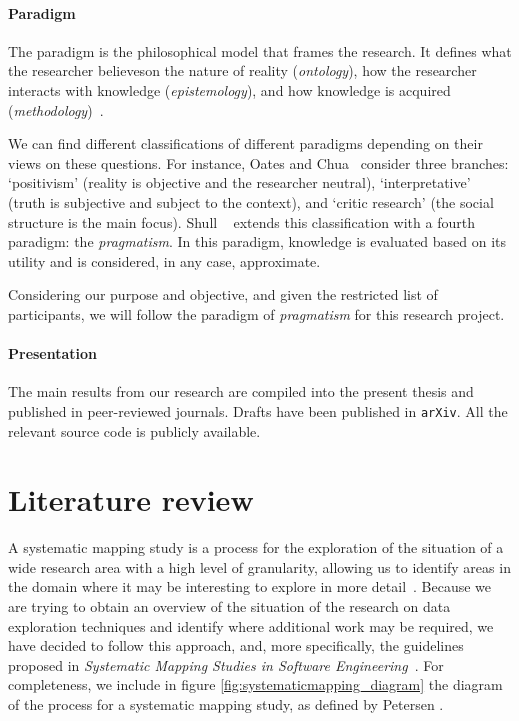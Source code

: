 \paragraph{Paradigm}
\label{method:paradigm}
The paradigm is the philosophical model that frames the research.
It defines what the researcher believes\footnotemark on the nature
of reality (\emph{ontology}), how the researcher interacts with
knowledge (\emph{epistemology}), and how knowledge is acquired
(\emph{methodology})~\cite{Guba1990}.

We can find different classifications of different paradigms depending on
their views on these questions. For instance, Oates and Chua~\cite{Chua1986}
consider three branches: `positivism' (reality is objective and the researcher neutral),
`interpretative' (truth is subjective and subject to the context), and
`critic research' (the social structure is the main focus).
Shull \etal~\cite{Shull2008} extends this classification with a fourth paradigm:
the \emph{pragmatism}. In this paradigm, knowledge is evaluated based on its
utility and is considered, in any case, approximate.

Considering our purpose and objective, and given the restricted list of
participants, we will follow the paradigm of \emph{pragmatism} for this research project.

\paragraph{Presentation}
\label{method:presentation}
The main results from our research are compiled into the present thesis
and published in peer-reviewed journals. Drafts have been published in \texttt{arXiv}.
All the relevant source code is publicly available.

\section{Literature review}
\label{sec:method_literature_review}
A systematic mapping study is a process for the exploration of the
situation of a wide research area with a high level of granularity,
allowing us to identify areas in the domain where it may be interesting to
explore in more detail~\cite{Kitchenham2007}. Because we are trying to obtain
an overview of the situation of the research on data exploration techniques
and identify where additional work may be required, we have decided to follow this
approach, and, more specifically, the guidelines proposed in
\emph{Systematic Mapping Studies in Software Engineering}~\cite{Petersen2007}.
For completeness, we include in figure \ref{fig:systematicmapping_diagram} the
diagram of the process for a systematic mapping study, as defined by
Petersen \etal.

